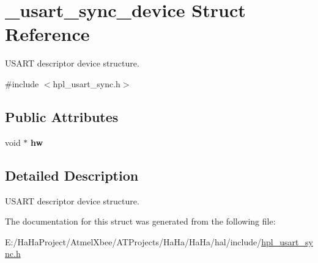 \hypertarget{struct__usart__sync__device}{}\section{\+\_\+usart\+\_\+sync\+\_\+device Struct Reference}
\label{struct__usart__sync__device}


U\+S\+A\+RT descriptor device structure.  




{\ttfamily \#include $<$hpl\+\_\+usart\+\_\+sync.\+h$>$}

\subsection*{Public Attributes}
\begin{DoxyCompactItemize}
\item 
\mbox{\label{struct__usart__sync__device_a299ec1be7b3e3f53a8f8921823a3480c}} 
void $\ast$ {\bfseries hw}
\end{DoxyCompactItemize}


\subsection{Detailed Description}
U\+S\+A\+RT descriptor device structure. 

The documentation for this struct was generated from the following file\+:\begin{DoxyCompactItemize}
\item 
E\+:/\+Ha\+Ha\+Project/\+Atmel\+Xbee/\+A\+T\+Projects/\+Ha\+Ha/\+Ha\+Ha/hal/include/\hyperlink{hpl__usart__sync_8h}{hpl\+\_\+usart\+\_\+sync.\+h}\end{DoxyCompactItemize}
